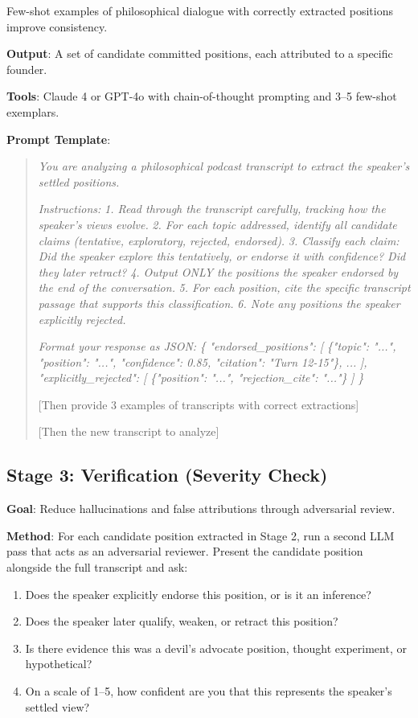 \documentclass[11pt,letterpaper]{article}
\begin{document}
Few-shot examples of philosophical dialogue with correctly extracted positions improve consistency.

\textbf{Output}: A set of candidate committed positions, each attributed to a specific founder.

\textbf{Tools}: Claude 4 or GPT-4o with chain-of-thought prompting and 3–5 few-shot exemplars.

\textbf{Prompt Template}:

\begin{quote}
\textit{You are analyzing a philosophical podcast transcript to extract the speaker's settled positions.}

\textit{Instructions:}
\textit{1. Read through the transcript carefully, tracking how the speaker's views evolve.}
\textit{2. For each topic addressed, identify all candidate claims (tentative, exploratory, rejected, endorsed).}
\textit{3. Classify each claim: Did the speaker explore this tentatively, or endorse it with confidence? Did they later retract?}
\textit{4. Output ONLY the positions the speaker endorsed by the end of the conversation.}
\textit{5. For each position, cite the specific transcript passage that supports this classification.}
\textit{6. Note any positions the speaker explicitly rejected.}

\textit{Format your response as JSON:}
\textit{\{}
\textit{  "endorsed\_positions": [}
\textit{    \{"topic": "...", "position": "...", "confidence": 0.85, "citation": "Turn 12-15"\},}
\textit{    ...}
\textit{  ],}
\textit{  "explicitly\_rejected": [}
\textit{    \{"position": "...", "rejection\_cite": "..."\}}
\textit{  ]}
\textit{\}}

[Then provide 3 examples of transcripts with correct extractions]

[Then the new transcript to analyze]
\end{quote}

\subsection{Stage 3: Verification (Severity Check)}

\textbf{Goal}: Reduce hallucinations and false attributions through adversarial review.

\textbf{Method}: For each candidate position extracted in Stage 2, run a second LLM pass that acts as an adversarial reviewer. Present the candidate position alongside the full transcript and ask:

\begin{enumerate}
  \item Does the speaker explicitly endorse this position, or is it an inference?
  \item Does the speaker later qualify, weaken, or retract this position?
  \item Is there evidence this was a devil's advocate position, thought experiment, or hypothetical?
  \item On a scale of 1–5, how confident are you that this represents the speaker's settled view?
\end{enumerate}
\end{document}
